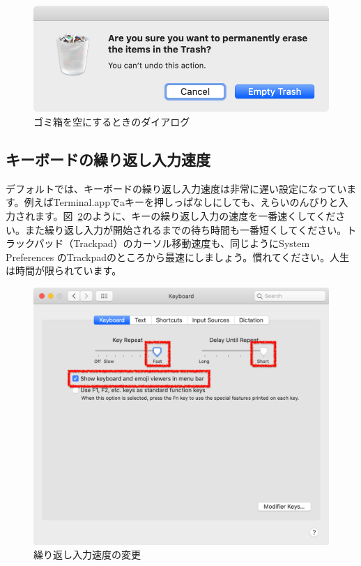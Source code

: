\begin{figure}
  \centering
  \includegraphics[scale=0.35]{fig/Trash_Dialog.png}
  \caption{ゴミ箱を空にするときのダイアログ}
  \label{fig:Trash_Dialog}
\end{figure}

\subsection{キーボードの繰り返し入力速度}
デフォルトでは、キーボードの繰り返し入力速度は非常に遅い設定になっています。例えばTerminal.appでaキーを押しっぱなしにしても、えらいのんびりと入力されます。図~\ref{fig:Keyboard_speed}のように、キーの繰り返し入力の速度を一番速くしてください。また繰り返し入力が開始されるまでの待ち時間も一番短くしてください。トラックパッド（Trackpad）のカーソル移動速度も、同じようにSystem Preferences のTrackpadのところから最速にしましょう。慣れてください。人生は時間が限られています。

\begin{figure}
  \centering
  \includegraphics[scale=0.35]{fig/Keyboard_speed.png}
  \caption{繰り返し入力速度の変更}
  \label{fig:Keyboard_speed}
\end{figure}

